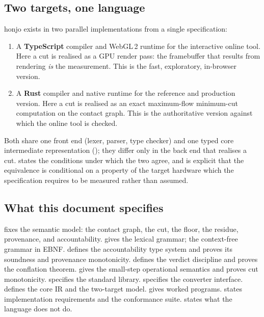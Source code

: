 \documentclass[11pt,twocolumn,a4paper]{article}
\theoremstyle{thmstyle}
\theoremstyle{definition}
\theoremstyle{remark}
\begin{document}
\subsection{Two targets, one language}

honjo exists in two parallel implementations from a single specification:

\begin{enumerate}[leftmargin=1.6em,itemsep=2pt]
\item A \textbf{TypeScript} compiler and WebGL\,2 runtime for the
interactive online tool. Here a cut is realised as a GPU render pass: the
framebuffer that results from rendering \emph{is} the measurement. This
is the fast, exploratory, in-browser version.
\item A \textbf{Rust} compiler and native runtime for the reference and
production version. Here a cut is realised as an exact maximum-flow
minimum-cut computation on the contact graph. This is the
authoritative version against which the online tool is checked.
\end{enumerate}

Both share one front end (lexer, parser, type checker) and one typed
core intermediate representation (); they differ only in the
back end that realises a cut.  states the
conditions under which the two agree, and  is
explicit that the equivalence is conditional on a property of the target
hardware which the specification requires to be measured rather than
assumed.

\subsection{What this document specifies}

 fixes the semantic model: the contact graph, the cut,
the floor, the residue, provenance, and accountability.
 gives the lexical grammar;  the
context-free grammar in EBNF.  defines the accountability
type system and proves its soundness and provenance monotonicity.
 defines the verdict discipline and proves the
conflation theorem.  gives the small-step operational
semantics and proves cut monotonicity.
 specifies the standard library.
 specifies the converter interface. 
defines the core IR and the two-target model.  gives
worked programs.  states implementation requirements and
the conformance suite.  states what the language does
not do.
\end{document}
